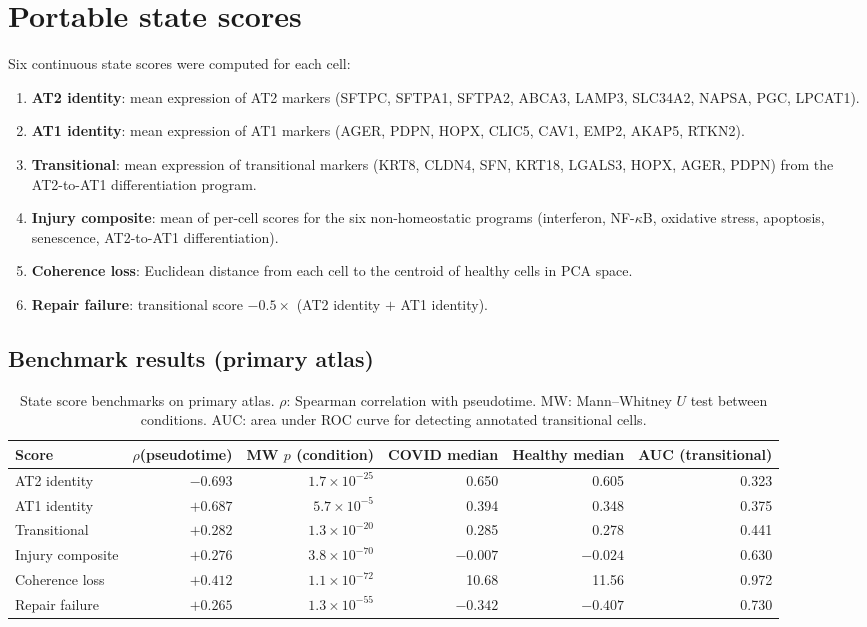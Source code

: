 \documentclass[11pt]{article}
\begin{document}
\section{Portable state scores}

Six continuous state scores were computed for each cell:

\begin{enumerate}
    \item \textbf{AT2 identity}: mean expression of AT2 markers (SFTPC, SFTPA1, SFTPA2, ABCA3, LAMP3, SLC34A2, NAPSA, PGC, LPCAT1).
    \item \textbf{AT1 identity}: mean expression of AT1 markers (AGER, PDPN, HOPX, CLIC5, CAV1, EMP2, AKAP5, RTKN2).
    \item \textbf{Transitional}: mean expression of transitional markers (KRT8, CLDN4, SFN, KRT18, LGALS3, HOPX, AGER, PDPN) from the AT2-to-AT1 differentiation program.
    \item \textbf{Injury composite}: mean of per-cell scores for the six non-homeostatic programs (interferon, NF-$\kappa$B, oxidative stress, apoptosis, senescence, AT2-to-AT1 differentiation).
    \item \textbf{Coherence loss}: Euclidean distance from each cell to the centroid of healthy cells in PCA space.
    \item \textbf{Repair failure}: transitional score $- 0.5 \times$ (AT2 identity $+$ AT1 identity).
\end{enumerate}

\subsection{Benchmark results (primary atlas)}

\begin{table}[h]
\centering
\small
\begin{tabular}{lrrrrr}
\toprule
Score & $\rho$(pseudotime) & MW $p$ (condition) & COVID median & Healthy median & AUC (transitional) \\
\midrule
AT2 identity & $-0.693$ & $1.7 \times 10^{-25}$ & 0.650 & 0.605 & 0.323 \\
AT1 identity & $+0.687$ & $5.7 \times 10^{-5}$ & 0.394 & 0.348 & 0.375 \\
Transitional & $+0.282$ & $1.3 \times 10^{-20}$ & 0.285 & 0.278 & 0.441 \\
Injury composite & $+0.276$ & $3.8 \times 10^{-70}$ & $-0.007$ & $-0.024$ & 0.630 \\
Coherence loss & $+0.412$ & $1.1 \times 10^{-72}$ & 10.68 & 11.56 & 0.972 \\
Repair failure & $+0.265$ & $1.3 \times 10^{-55}$ & $-0.342$ & $-0.407$ & 0.730 \\
\bottomrule
\end{tabular}
\caption{State score benchmarks on primary atlas. $\rho$: Spearman correlation with pseudotime. MW: Mann--Whitney $U$ test between conditions. AUC: area under ROC curve for detecting annotated transitional cells.}
\end{table}
\end{document}

